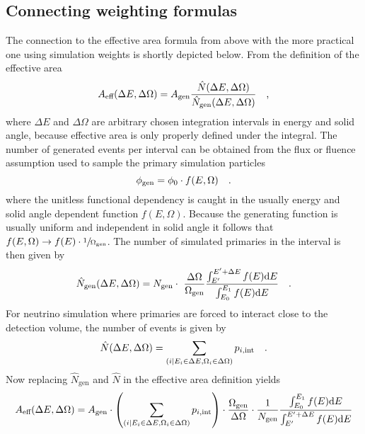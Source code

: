 \subsection{Connecting weighting formulas}
The connection to the effective area formula from above with the more practical one using simulation weights is shortly depicted below.
From the definition of the effective area
\begin{equation}
  A_\text{eff}(\Delta E, \Delta \Omega) =
    A_\text{gen} \frac{\hat{N}(\Delta E, \Delta \Omega)}
                      {\hat{N}_\text{gen}(\Delta E, \Delta \Omega)}
  \quad\text{,}
\end{equation}
where $\Delta E$ and $\Delta \Omega$ are arbitrary chosen integration intervals in energy and solid angle, because effective area is only properly defined under the integral.
The number of generated events per interval can be obtained from the flux or fluence assumption used to sample the primary simulation particles
\begin{equation}
  \phi_\text{gen} = \phi_0 \cdot f(E, \Omega)
  \quad\text{.}
\end{equation}
where the unitless functional dependency is caught in the usually energy and solid angle dependent function $f(E, \Omega)$.
Because the generating function is usually uniform and independent in solid angle it follows that $f(E, \Omega) \rightarrow f(E)\cdot \sfrac{1}{\Omega_\text{gen}}$.
The number of simulated primaries in the interval is then given by
\begin{equation}
  \hat{N}_\text{gen}(\Delta E, \Delta\Omega) =
    N_\text{gen} \cdot \frac{\Delta\Omega}{\Omega_\text{gen}}
    \frac{\int_{E'}^{E'+\Delta E} f(E) \d{E}}
         {\int_{E_0}^{E_1} f(E) \d{E}}
  \mperiod
\end{equation}
For neutrino simulation where primaries are forced to interact close to the detection volume, the number of events is given by
\begin{equation}
  \hat{N}(\Delta E, \Delta \Omega) =
  \sum_{(i|E_i\in\Delta E, \Omega_i\in\Delta\Omega)} p_{i,\text{int}}
  \quad\text{.}
\end{equation}
Now replacing $\hat{N}_\text{gen}$ and $\hat{N}$ in the effective area definition yields
\begin{equation}
  A_\text{eff}(\Delta E, \Delta \Omega) =
    A_\text{gen} \cdot
    \left(\sum_{(i|E_i\in\Delta E, \Omega_i\in\Delta\Omega)}
          p_{i,\text{int}}\right) \cdot
    \frac{\Omega_\text{gen}}{\Delta\Omega} \cdot \frac{1}{N_\text{gen}}
    \frac{\int_{E_0}^{E_1} f(E) \mathrm{d}E}
         {\int_{E'}^{E'+\Delta E} f(E) \mathrm{d}E}
\end{equation}
